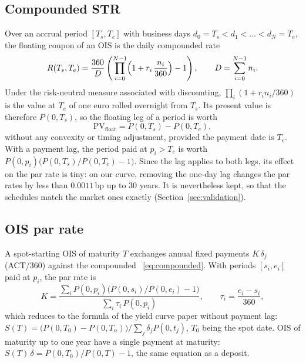 \documentclass[11pt,a4paper]{article}
\theoremstyle{plain}
\theoremstyle{definition}
\newcommand{\bp}{\,\mathrm{bp}}
\newcommand{\estr}{\text{\texteuro STR}}
\begin{document}
\subsection{Compounded \texteuro STR}
Over an accrual period $[T_s,T_e]$ with business days $d_0=T_s<d_1<\dots<d_N=T_e$, the floating coupon of an OIS is the daily compounded rate
\begin{equation}
    R(T_s,T_e)=\frac{360}{D}\left(\prod_{i=0}^{N-1}\Bigl(1+r_i\,\frac{n_i}{360}\Bigr)-1\right),\qquad D=\sum_{i=0}^{N-1}n_i.
    \label{eq:compounded}
\end{equation}
Under the risk-neutral measure associated with \estr{} discounting, $\prod_i(1+r_in_i/360)$ is the value at $T_e$ of one euro rolled overnight from $T_s$. Its present value is therefore $P(0,T_s)$, so the floating leg of a period is worth
\begin{equation}
    \text{PV}_{\text{float}}=P(0,T_s)-P(0,T_e),
    \label{eq:float-leg}
\end{equation}
without any convexity or timing adjustment, provided the payment date is $T_e$. With a payment lag, the period paid at $p_i>T_e$ is worth $P(0,p_i)\bigl(P(0,T_s)/P(0,T_e)-1\bigr)$. Since the lag applies to both legs, its effect on the par rate is tiny: on our curve, removing the one-day lag changes the par rates by less than $0.0011\bp$ up to 30 years. It is nevertheless kept, so that the schedules match the market ones exactly (Section~\ref{sec:validation}).

\subsection{OIS par rate}
A spot-starting OIS of maturity $T$ exchanges annual fixed payments $K\,\delta_j$ (ACT/360) against the compounded \estr{}~\eqref{eq:compounded}. With periods $[s_i,e_i]$ paid at $p_i$, the par rate is
\begin{equation}
    K=\frac{\sum_iP(0,p_i)\bigl(P(0,s_i)/P(0,e_i)-1\bigr)}{\sum_i\tau_i\,P(0,p_i)},\qquad \tau_i=\frac{e_i-s_i}{360},
    \label{eq:ois-par}
\end{equation}
which reduces to the formula of the yield curve paper without payment lag: $S(T)=\bigl(P(0,T_0)-P(0,T_n)\bigr)/\sum_j\delta_jP(0,t_j)$, $T_0$ being the spot date. OIS of maturity up to one year have a single payment at maturity: $S(T)\,\delta=P(0,T_0)/P(0,T)-1$, the same equation as a deposit.
\end{document}
